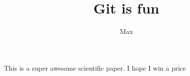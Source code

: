 \documentclass[10pt]{article}
\author{Max}
\title{Git is fun}
\begin{document}
	\maketitle

	This is a super awesome scientific paper.
	I hope I win a price
\end{document}
